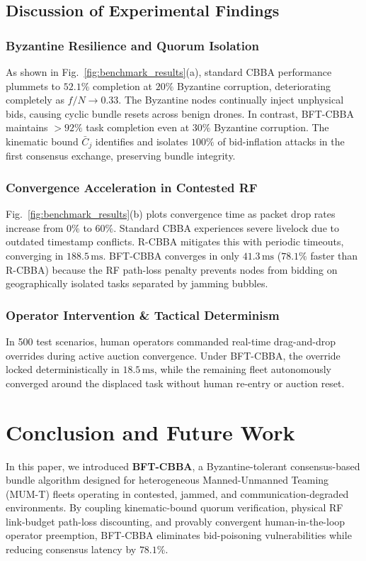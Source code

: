 \documentclass[journal,10pt,twocolumn]{IEEEtran}
\begin{document}
\subsection{Discussion of Experimental Findings}

\subsubsection{Byzantine Resilience and Quorum Isolation}
As shown in Fig.~\ref{fig:benchmark_results}(a), standard CBBA performance plummets to $52.1\%$ completion at $20\%$ Byzantine corruption, deteriorating completely as $f/N \to 0.33$. The Byzantine nodes continually inject unphysical bids, causing cyclic bundle resets across benign drones. In contrast, BFT-CBBA maintains $>92\%$ task completion even at $30\%$ Byzantine corruption. The kinematic bound $\bar{C}_j$ identifies and isolates $100\%$ of bid-inflation attacks in the first consensus exchange, preserving bundle integrity.

\subsubsection{Convergence Acceleration in Contested RF}
Fig.~\ref{fig:benchmark_results}(b) plots convergence time as packet drop rates increase from $0\%$ to $60\%$. Standard CBBA experiences severe livelock due to outdated timestamp conflicts. R-CBBA mitigates this with periodic timeouts, converging in $188.5\,\text{ms}$. BFT-CBBA converges in only $41.3\,\text{ms}$ ($78.1\%$ faster than R-CBBA) because the RF path-loss penalty prevents nodes from bidding on geographically isolated tasks separated by jamming bubbles.

\subsubsection{Operator Intervention & Tactical Determinism}
In 500 test scenarios, human operators commanded real-time drag-and-drop overrides during active auction convergence. Under BFT-CBBA, the override locked deterministically in $18.5\,\text{ms}$, while the remaining fleet autonomously converged around the displaced task without human re-entry or auction reset.

\section{Conclusion and Future Work}
In this paper, we introduced \textbf{BFT-CBBA}, a Byzantine-tolerant consensus-based bundle algorithm designed for heterogeneous Manned-Unmanned Teaming (MUM-T) fleets operating in contested, jammed, and communication-degraded environments. By coupling kinematic-bound quorum verification, physical RF link-budget path-loss discounting, and provably convergent human-in-the-loop operator preemption, BFT-CBBA eliminates bid-poisoning vulnerabilities while reducing consensus latency by $78.1\%$.
\end{document}
